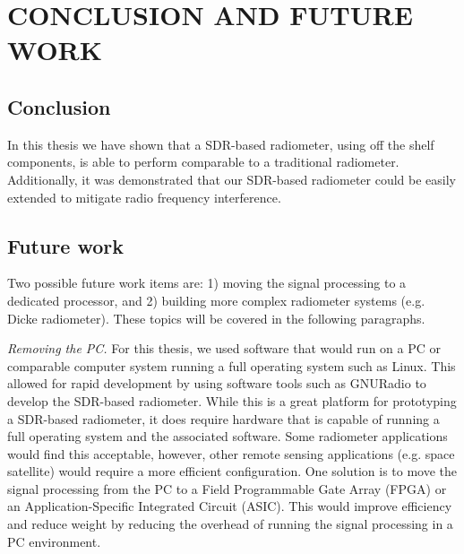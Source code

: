 
\chapter{CONCLUSION AND FUTURE WORK} \label{ch:conclusion}

\section{Conclusion}
In this thesis we have shown that a SDR-based radiometer, using off the shelf components, is able to perform comparable to a traditional radiometer.  Additionally, it was demonstrated that our SDR-based radiometer could be easily extended to mitigate radio frequency interference.   


\section{Future work}\label{Futurework}

Two possible future work items are: 1) moving the signal processing to a dedicated processor, and 2) building more complex radiometer systems (e.g. Dicke radiometer).  These topics will be covered in the following paragraphs.   

\emph{Removing the PC.}  For this thesis, we used software that would run on a PC or comparable computer system running a full operating system such as Linux.  This allowed for rapid development by using software tools such as GNURadio to develop the SDR-based radiometer.  While this is a great platform for prototyping a SDR-based radiometer, it does require hardware that is capable of running a full operating system and the associated software.  Some radiometer applications would find this acceptable, however, other remote sensing applications (e.g. space satellite) would require a more efficient configuration.  One solution is to move the signal processing from the PC to a Field Programmable Gate Array (FPGA) or an Application-Specific Integrated Circuit (ASIC).  This would improve efficiency and reduce weight by reducing the overhead of running the signal processing in a PC environment. 

